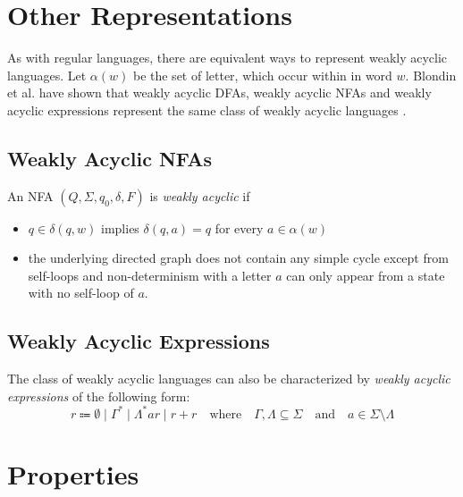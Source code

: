 \section{Other Representations}

As with regular languages, there are equivalent ways to represent weakly acyclic languages. Let $\alpha(w)$ be the set of letter, which occur within in word $w$. 
Blondin et al. have shown that weakly acyclic DFAs, weakly acyclic NFAs and weakly acyclic expressions represent the same class of weakly acyclic languages \cite{blondin_24}. 



\subsection{Weakly Acyclic NFAs}
An NFA $(Q, \Sigma, q_{0},\delta,F)$ is \textit{weakly acyclic} if 
\begin{itemize}[--,noitemsep]
	\item $q \in \delta(q,w)$ implies $\delta(q,a) = {q}$ for every $a \in \alpha(w)$
	\item the underlying directed graph does not contain any simple cycle except from self-loops and non-determinism with a letter $a$ can only appear from a state with no self-loop of $a$.
\end{itemize}

\subsection{Weakly Acyclic Expressions}\label{sec:weakly_acyclic_regex}
The class of weakly acyclic languages can also be characterized by \textit{weakly acyclic expressions} of the following form:
\begin{equation*}
r \Coloneqq \emptyset \mid \Gamma^{*} \mid \Lambda^{*} a r \mid r + r \quad \text{where} \quad  \Gamma, \Lambda \subseteq \Sigma \quad \textrm{and} \quad a \in \Sigma \setminus \Lambda
\end{equation*}


\section{Properties}

